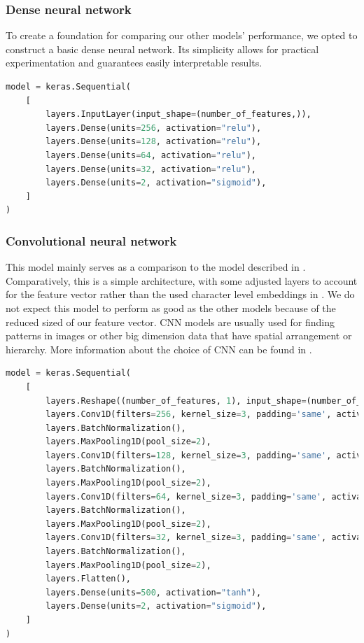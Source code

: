 \documentclass{article}
\begin{document}
    \subsubsection{Dense neural network}
    To create a foundation for comparing our other models' performance, we opted to construct a basic dense neural network.
    Its simplicity allows for practical experimentation and guarantees easily interpretable results.

    \begin{lstlisting}[language=Python, caption=DNN on feature vector architecture]
model = keras.Sequential(
    [
        layers.InputLayer(input_shape=(number_of_features,)),
        layers.Dense(units=256, activation="relu"),
        layers.Dense(units=128, activation="relu"),
        layers.Dense(units=64, activation="relu"),
        layers.Dense(units=32, activation="relu"),
        layers.Dense(units=2, activation="sigmoid"),
    ]
)
    \end{lstlisting}

    \subsubsection{Convolutional neural network}\label{subsubsec:feature-vector-cnn}
    This model mainly serves as a comparison to the model described in .
    Comparatively, this is a simple architecture, with some adjusted layers to account for the feature vector rather than the used character level embeddings in .
    We do not expect this model to perform as good as the other models because of the reduced sized of our feature vector.
    CNN models are usually used for finding patterns in images or other big dimension data that have spatial arrangement or hierarchy.
    More information about the choice of CNN can be found in .

    \begin{lstlisting}[language=Python, caption=CNN on feature vector architecture]
model = keras.Sequential(
    [
        layers.Reshape((number_of_features, 1), input_shape=(number_of_features,)),
        layers.Conv1D(filters=256, kernel_size=3, padding='same', activation="tanh"),
        layers.BatchNormalization(),
        layers.MaxPooling1D(pool_size=2),
        layers.Conv1D(filters=128, kernel_size=3, padding='same', activation="tanh"),
        layers.BatchNormalization(),
        layers.MaxPooling1D(pool_size=2),
        layers.Conv1D(filters=64, kernel_size=3, padding='same', activation="tanh"),
        layers.BatchNormalization(),
        layers.MaxPooling1D(pool_size=2),
        layers.Conv1D(filters=32, kernel_size=3, padding='same', activation="tanh"),
        layers.BatchNormalization(),
        layers.MaxPooling1D(pool_size=2),
        layers.Flatten(),
        layers.Dense(units=500, activation="tanh"),
        layers.Dense(units=2, activation="sigmoid"),
    ]
)
    \end{lstlisting}
\end{document}
